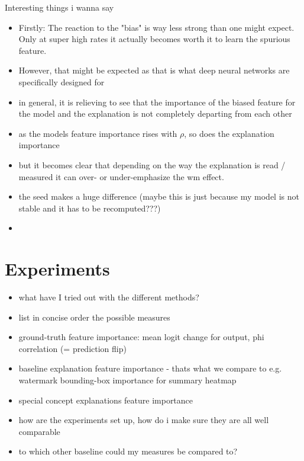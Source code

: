 Interesting things i wanna say
\begin{itemize}
    \item Firstly: The reaction to the "bias" is way less strong than one might expect. Only at super high rates it actually becomes worth it to learn the spurious feature.
    \item However, that might be expected as that is what deep neural networks are specifically designed for
    \item in general, it is relieving to see that the importance of the biased feature for the model and the explanation is not completely departing from each other
    \item as the models feature importance rises with $\rho$, so does the explanation importance
    \item but it becomes clear that depending on the way the explanation is read / measured it can over- or under-emphasize the wm effect. 
    \item the seed makes a huge difference (maybe this is just because my model is not stable and it has to be recomputed???) 
    \item 
\end{itemize}

\section{Experiments}
\begin{itemize}
    \item what have I tried out with the different methods?
    \item list in concise order the possible measures
    \item ground-truth feature importance: mean logit change for output, phi correlation (= prediction flip)
    \item baseline explanation feature importance - thats what we compare to e.g. watermark bounding-box importance for summary heatmap
    \item special concept explanations feature importance
    \item how are the experiments set up, how do i make sure they are all well comparable
    \item to which other baseline could my measures be compared to?
\end{itemize}

